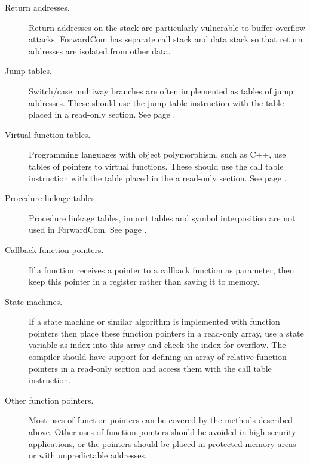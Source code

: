 \documentclass[forwardcom.tex]{subfiles}
\begin{document}
\begin{description}
\item[Return addresses.] Return addresses on the stack are particularly vulnerable to buffer overflow attacks. ForwardCom has separate call stack and data stack so that return addresses are isolated from other data.

\item[Jump tables.] Switch/case multiway branches are often implemented as tables of jump addresses. These should use the jump table instruction with the table placed in a read-only section. See page \pageref{table:indirectJumpInstruction}.

\item[Virtual function tables.] Programming languages with object polymorphism, such as C++, use tables of pointers to virtual functions. These should use the call table instruction with the table placed in the a read-only section. See page \pageref{table:IndirectCallInstruction}.

\item[Procedure linkage tables.] Procedure linkage tables, import tables and symbol interposition are not used in ForwardCom. See page \pageref{libraryLinkMethods}.

\item[Callback function pointers.] If a function receives a pointer to a callback function as parameter, then keep this pointer in a register rather than saving it to memory.

\item[State machines.] If a state machine or similar algorithm is implemented with function pointers then place these function pointers in a read-only array, use a state variable as index into this array and check the index for overflow. The compiler should have support for defining an array of relative function pointers in a read-only section and access them with the call table instruction.

\item[Other function pointers.] Most uses of function pointers can be covered by the methods described above. Other uses of function pointers should be avoided in high security applications, or the pointers should be placed in protected memory areas or with unpredictable addresses. 

\end{description}
\end{document}
